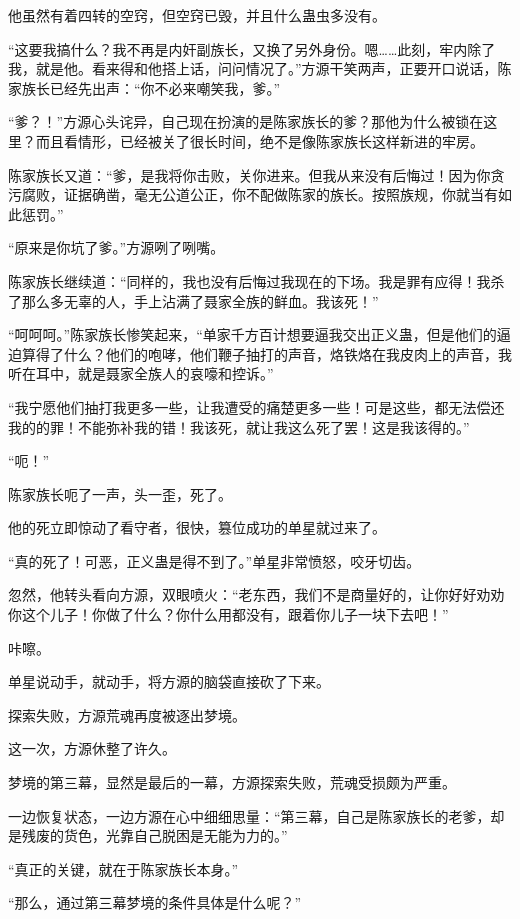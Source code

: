 \begin{this_body}
他虽然有着四转的空窍，但空窍已毁，并且什么蛊虫多没有。

“这要我搞什么？我不再是内奸副族长，又换了另外身份。嗯……此刻，牢内除了我，就是他。看来得和他搭上话，问问情况了。”方源干笑两声，正要开口说话，陈家族长已经先出声：“你不必来嘲笑我，爹。”

“爹？！”方源心头诧异，自己现在扮演的是陈家族长的爹？那他为什么被锁在这里？而且看情形，已经被关了很长时间，绝不是像陈家族长这样新进的牢房。

陈家族长又道：“爹，是我将你击败，关你进来。但我从来没有后悔过！因为你贪污腐败，证据确凿，毫无公道公正，你不配做陈家的族长。按照族规，你就当有如此惩罚。”

“原来是你坑了爹。”方源咧了咧嘴。

陈家族长继续道：“同样的，我也没有后悔过我现在的下场。我是罪有应得！我杀了那么多无辜的人，手上沾满了聂家全族的鲜血。我该死！”

“呵呵呵。”陈家族长惨笑起来，“单家千方百计想要逼我交出正义蛊，但是他们的逼迫算得了什么？他们的咆哮，他们鞭子抽打的声音，烙铁烙在我皮肉上的声音，我听在耳中，就是聂家全族人的哀嚎和控诉。”

“我宁愿他们抽打我更多一些，让我遭受的痛楚更多一些！可是这些，都无法偿还我的的罪！不能弥补我的错！我该死，就让我这么死了罢！这是我该得的。”

“呃！”

陈家族长呃了一声，头一歪，死了。

他的死立即惊动了看守者，很快，篡位成功的单星就过来了。

“真的死了！可恶，正义蛊是得不到了。”单星非常愤怒，咬牙切齿。

忽然，他转头看向方源，双眼喷火：“老东西，我们不是商量好的，让你好好劝劝你这个儿子！你做了什么？你什么用都没有，跟着你儿子一块下去吧！”

咔嚓。

单星说动手，就动手，将方源的脑袋直接砍了下来。

探索失败，方源荒魂再度被逐出梦境。

这一次，方源休整了许久。

梦境的第三幕，显然是最后的一幕，方源探索失败，荒魂受损颇为严重。

一边恢复状态，一边方源在心中细细思量：“第三幕，自己是陈家族长的老爹，却是残废的货色，光靠自己脱困是无能为力的。”

“真正的关键，就在于陈家族长本身。”

“那么，通过第三幕梦境的条件具体是什么呢？”


\end{this_body}
